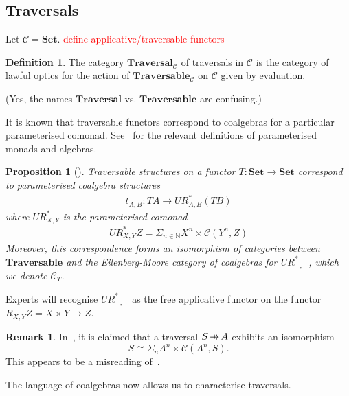 \documentclass[11pt,a4paper]{article}
\theoremstyle{plain}
\newtheorem{proposition}[theorem]{Proposition}
\theoremstyle{definition}
\newtheorem{definition}[theorem]{Definition}
\newtheorem{remark}[theorem]{Remark}
\newcommand{\C}{\mathscr{C}}
\newcommand{\homC}{\underline{\C}}
\newcommand{\bN}{\mathbb{N}}
\newcommand{\Set}{\mathbf{Set}}
\newcommand{\Traversable}{\mathbf{Traversable}}
\newcommand{\Traversal}{\mathbf{Traversal}}
\newcommand{\hto}{\ensuremath{\,\mathaccent\shortmid\rightarrow\,}}
\newcommand{\todo}[1]{\textcolor{red}{\small #1}}
\begin{document}
\subsection{Traversals}
Let $\C = \Set$. \todo{define applicative/traversable functors}

\begin{definition}
The category $\Traversal_\C$ of traversals in $\C$ is the category of lawful optics for the action of $\Traversable_\C$ on $\C$ given by evaluation.
\end{definition}

(Yes, the names $\Traversal$ vs\@. $\Traversable$ are confusing.)

It is known that traversable functors correspond to coalgebras for a particular parameterised comonad. See~\cite{AlgebrasForParameterisedMonads} for the relevant definitions of parameterised monads and algebras.

\begin{proposition}[{\cite[Theorem 4.10, Proposition 5.4]{SecondOrderFunctionals}}]
Traversable structures on a functor $T : \Set \to \Set$ correspond to parameterised coalgebra structures
\begin{align*}
t_{A, B} : TA \to UR^*_{A, B}(T B)
\end{align*} 
where $UR^*_{X,Y}$ is the parameterised comonad
\begin{align*}
UR^*_{X, Y} Z = \Sigma_{n\in \bN} X^n \times \homC(Y^n,Z)
\end{align*}
Moreover, this correspondence forms an isomorphism of categories between $\Traversable$ and the Eilenberg-Moore category of coalgebras for $UR^*_{-, -}$, which we denote $\C_T$.
\end{proposition}

Experts will recognise $UR^*_{-, -}$ as the free applicative functor \cite{FreeApplicativeFunctors} on the functor $R_{X,Y} Z = X \times Y \to Z$.

\begin{remark}
In~\cite[Section 2.3]{ProfunctorOptics}, it is claimed that a traversal $S \hto A$ exhibits an isomorphism \[S \cong \Sigma_n A^n \times \homC(A^n,S).\] This appears to be a misreading of~\cite[Proposition 5.4]{SecondOrderFunctionals}.
\end{remark}

The language of coalgebras now allows us to characterise traversals.
\end{document}
